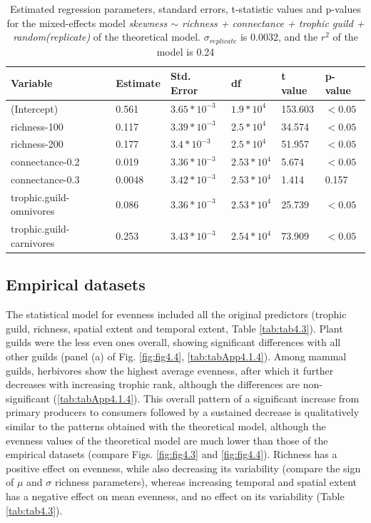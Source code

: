 \begin{table}[ht!]
\centering
\caption[Coefficients from skewness regression in simulated networks]{\color{Gray}Estimated regression parameters, standard errors, t-statistic values and p-values for the mixed-effects model \textit{skewness $\sim$  richness + connectance + trophic guild + random(replicate)} of the theoretical model. $\sigma_{replicate}$ is 0.0032, and the $r^2$ of the model is 0.24}\label{tab:tab4.2}
\begin{tabular}{llllll}
\hline
Variable & Estimate & Std. Error &         df & t value & p-value \\
\hline
(Intercept)       & 0.561 &  $3.65*10^{-3}$ & $1.9*10^{4}$ & 153.603 & $<0.05$ \\
richness-100      & 0.117 &  $3.39*10^{-3}$ & $2.5*10^{4}$ & 34.574 & $<0.05$ \\
richness-200      & 0.177 &  $3.4*10^{-3}$ & $2.5*10^{4}$ &  51.957 & $<0.05$ \\
connectance-0.2   & 0.019 &  $3.36*10^{-3}$ & $2.53*10^{4}$ &   5.674 & $<0.05$ \\
connectance-0.3   & 0.0048 &  $3.42*10^{-3}$ & $2.53*10^{4}$ &   1.414  &  0.157  \\
trophic.guild-omnivores & 0.086 &  $3.36*10^{-3}$ & $2.53*10^{4}$ &  25.739  & $<0.05$ \\
trophic.guild-carnivores & 0.253 &  $3.43*10^{-3}$ & $2.54*10^{4}$ &  73.909  & $<0.05$ \\
\hline
\end{tabular}

\end{table}

\FloatBarrier

\subsection*{Empirical datasets}

The statistical model for evenness included all the original predictors (trophic guild, richness, spatial extent and temporal extent, Table \ref{tab:tab4.3}). Plant guilds were the less even ones overall, showing significant differences with all other guilds (panel (a) of Fig. \ref{fig:fig4.4}, \cref{tab:tabApp4.1.4}). Among mammal guilds, herbivores show the highest average evenness, after which it further decreases with increasing trophic rank, although the differences are non-significant (\cref{tab:tabApp4.1.4}). This overall pattern of a significant increase from primary producers to consumers followed by a sustained decrease is qualitatively similar to the patterns obtained with the theoretical model, although the evenness values of the theoretical model are much lower than those of the empirical datasets (compare Figs. \ref{fig:fig4.3} and \ref{fig:fig4.4}). Richness has a positive effect on evenness, while also decreasing its variability (compare the sign of $\mu$ and $\sigma$ richness parameters), whereas increasing temporal and spatial extent has a negative effect on mean evenness, and no effect on its variability (Table \ref{tab:tab4.3}).

